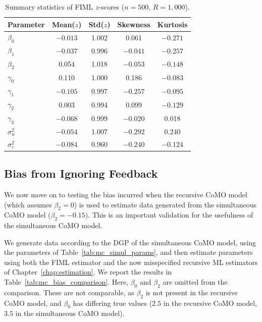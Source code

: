 \begin{table}[htbp]
\centering
\caption[Summary statistics of FIML $z$-scores]{Summary statistics of FIML $z$-scores ($n = 500$, $R = 1{,}000$).}
\label{tab:mc_simul_zscores}
\begin{tabular}{lcccc}
\toprule
Parameter & Mean($z$) & Std($z$) & Skewness & Kurtosis \\
\midrule
$\beta_0$ & $-0.013$ & 1.002 & 0.061 & $-0.271$ \\
$\beta_1$ & $-0.037$ & 0.996 & $-0.041$ & $-0.257$ \\
$\beta_2$ & 0.054 & 1.018 & $-0.053$ & $-0.148$ \\
$\gamma_0$ & 0.110 & 1.000 & 0.186 & $-0.083$ \\
$\gamma_1$ & $-0.105$ & 0.997 & $-0.257$ & $-0.095$ \\
$\gamma_2$ & 0.003 & 0.994 & 0.099 & $-0.129$ \\
$\gamma_3$ & $-0.068$ & 0.999 & $-0.020$ & 0.018 \\
$\sigma_u^2$ & $-0.054$ & 1.007 & $-0.292$ & 0.240 \\
$\sigma_\varepsilon^2$ & $-0.084$ & 0.960 & $-0.240$ & $-0.124$ \\
\bottomrule
\end{tabular}
\end{table}

\subsection{Bias from Ignoring Feedback}
\label{sec:simul:mc_bias}
We now move on to testing the bias incurred when the recursive CoMO model (which assumes $\beta_2 = 0$) is used to estimate data generated from the simultaneous CoMO model ($\beta_2 = -0.15$). This is an important validation for the usefulness of the simultaneous CoMO model.

We generate data according to the DGP of the simultaneous CoMO model, using the parameters of Table~\ref{tab:mc_simul_params}, and then estimate parameters using both the FIML estimator and the now misspecified recursive ML estimators of Chapter~\ref{chap:estimation}. We report the results in Table~\ref{tab:mc_bias_comparison}. Here, $\beta_0$ and $\beta_2$ are omitted from the comparison. These are not comparable, as $\beta_2$ is not present in the recursive CoMO model, and $\beta_0$ has differing true values ($2.5$ in the recursive CoMO model, $3.5$ in the simultaneous CoMO model).

